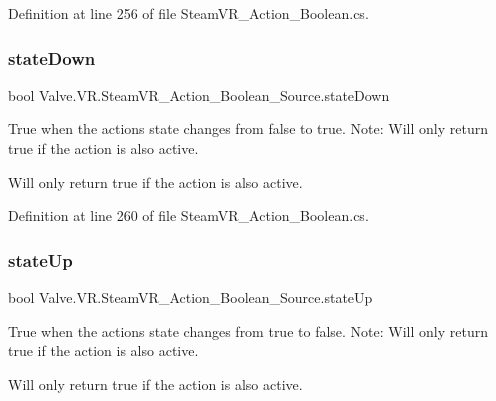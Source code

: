 Definition at line 256 of file Steam\+V\+R\+\_\+\+Action\+\_\+\+Boolean.\+cs.

\mbox{\label{class_valve_1_1_v_r_1_1_steam_v_r___action___boolean___source_aee3c0e3480c1837b3455229733a2d58c}} 
\subsubsection{\texorpdfstring{stateDown}{stateDown}}
{\footnotesize\ttfamily bool Valve.\+V\+R.\+Steam\+V\+R\+\_\+\+Action\+\_\+\+Boolean\+\_\+\+Source.\+state\+Down\hspace{0.3cm}{\ttfamily [get]}}



True when the action\textquotesingle{}s state changes from false to true. Note\+: Will only return true if the action is also active. 

Will only return true if the action is also active.

Definition at line 260 of file Steam\+V\+R\+\_\+\+Action\+\_\+\+Boolean.\+cs.

\mbox{\label{class_valve_1_1_v_r_1_1_steam_v_r___action___boolean___source_a1fc319a221f4ca4f89c35b0836bd6d81}} 
\subsubsection{\texorpdfstring{stateUp}{stateUp}}
{\footnotesize\ttfamily bool Valve.\+V\+R.\+Steam\+V\+R\+\_\+\+Action\+\_\+\+Boolean\+\_\+\+Source.\+state\+Up\hspace{0.3cm}{\ttfamily [get]}}



True when the action\textquotesingle{}s state changes from true to false. Note\+: Will only return true if the action is also active. 

Will only return true if the action is also active.

